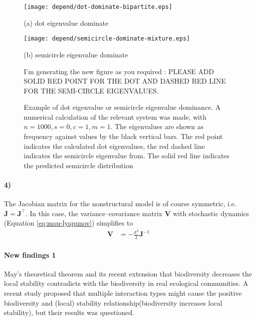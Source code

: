 \documentclass[a4paper,fleqn,12pt]{article}
\begin{document}
\begin{figure}[htbp]
\begin{minipage}{0.45\linewidth}
  \texttt{[image: depend/dot-dominate-bipartite.eps]}
  {\centering(a) dot eigenvalue dominate\par}
\end{minipage}
\hfill
\begin{minipage}{0.45\linewidth}
  \texttt{[image: depend/semicircle-dominate-mixture.eps]}
  {\centering(b) semicircle eigenvalue dominate\par}
\end{minipage}
\caption{Example of dot eigenvalue or semicircle eigenvalue dominance. A numerical calculation of the relevant system was made, with $n = 1000, s = 0, c = 1, m = 1$. The eigenvalues are shown as frequency against values by the black vertical bars. The red point indicates the calculated dot eigenvalues, the red dashed line indicates the semicircle eigenvalue from. 
The solid red line indicates the predicted semicircle distribution 
} 
{\color{red} I'm generating the new figure as you required : PLEASE ADD SOLID RED POINT FOR THE DOT AND DASHED RED LINE FOR THE SEMI-CIRCLE EIGENVALUES.}
\label{fig:semicircle-dot-eigenvalue-dominate}
\end{figure}



\paragraph*{4)} The Jacobian matrix for the nonstructural model is of course symmetric, i.e. $\mathbf{J} = \mathbf{J}^\top$.
In this case, the variance--covariance matrix $\mathbf{V}$ with stochastic dynamics (Equation \ref{eq:mou-lyapunov}) simplifies to
\begin{align} \label{eq:mou-covariance-symmetric}
\mathbf{V} &= - \frac{\sigma^2}{2} \mathbf{J}^{-1}
\end{align}


\paragraph*{New findings 1}
May's theoretical theorem\cite{may_stability_2001} and its recent extension\cite{allesina_stability_2012} that biodiversity decreases the local stability contradicts with the biodiversity in real ecological communities.
A recent study \cite{mougi_diversity_2012} proposed that multiple interaction types might cause the positive biodiversity and (local) stability relationship(biodiversity increases local stability), but their results was questioned\cite{suweis_disentangling_2013}.
\end{document}
